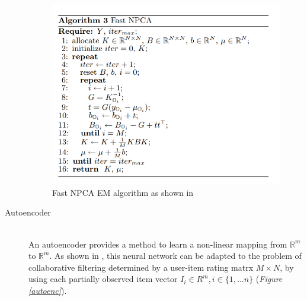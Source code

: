 \documentclass[10pt,conference,compsocconf]{IEEEtran}
\begin{document}
\begin{description}
\begin{figure}[t!]
\centering
\includegraphics[scale=0.6]{emnpca.png}
\caption{Fast NPCA EM algorithm as shown in \cite{npca}}
\label{emnpca}
\end{figure} 

\item[Autoencoder] \ \\
An autoencoder provides a method to learn a non-linear mapping from $\mathbb{R}^{m}$ to $\mathbb{R}^{m}$. As shown in \cite{autorec}, this neural network can be adapted to the problem of collaborative filtering determined by a user-item rating matrx $M \times N$, by using each partially observed item vector $I_{i} \in {R}^{m} , i \in \{1,...n\}$ (\emph{Figure \ref{autoenc}}).


\end{description}
\end{document}
